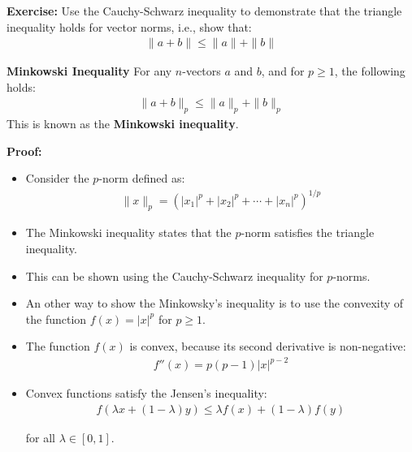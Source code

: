 \begin{frame}
    \textbf{Exercise:} Use the Cauchy-Schwarz inequality to demonstrate that the triangle inequality holds for vector norms, i.e., show that:
    \begin{align*}
        \|a + b\| \leq \|a\| + \|b\|
    \end{align*}
\end{frame}
\begin{frame}
\begin{block}{\textbf{Minkowski Inequality}}
    For any $n$-vectors $a$ and $b$, and for $p \geq 1$, the following holds:
    \begin{align}
        \|a + b\|_p \leq \|a\|_p + \|b\|_p
    \end{align}
    This is known as the \textbf{Minkowski inequality}. 
\end{block}
\textbf{Proof: }
\begin{itemize}
    \item Consider the $p$-norm defined as:
    \begin{align*}
        \|x\|_p = (|x_1|^p + |x_2|^p + \cdots + |x_n|^p)^{1/p}
    \end{align*}
    \item The Minkowski inequality states that the $p$-norm satisfies the triangle inequality.
    \item This can be shown using the Cauchy-Schwarz inequality for $p$-norms.
\end{itemize}
\end{frame}
\begin{frame}
    \begin{itemize}
        \item An other way to show  the Minkowsky's inequality is  to  use the convexity of the function $f(x) = |x|^p$ for $p \geq 1$.
        \item The function $f(x)$ is convex, because its second derivative is non-negative:
        \begin{align*}
            f''(x) = p(p-1)|x|^{p-2}
        \end{align*}
        \item Convex functions satisfy the Jensen's inequality:
        \begin{align*}
            f(\lambda x + (1 - \lambda) y) \leq \lambda f(x) + (1 - \lambda) f(y)
        \end{align*}    

     for all $\lambda \in [0, 1]$.
    \end{itemize}
\end{frame}

